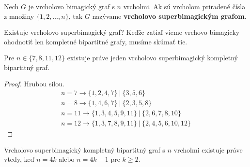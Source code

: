 \begin{definition} Nech $G$ je vrcholovo bimagický graf s $n$ vrcholmi. Ak sú vrcholom priradené čísla z množiny $\{1, 2, \dots , n\}$, tak $G$ nazývame \textbf{vrcholovo superbimagickým grafom}.
\end{definition} 

Existuje vrcholovo superbimagický graf? Keďže zatiaľ vieme vrchovo bimagicky ohodnotiť len kompletné bipartitné grafy, musíme skúmať tie. \\

\begin{theorem}
\label{vsbg1}
Pre $n \in \{7, 8, 11, 12\}$  existuje práve jeden vrcholovo superbimagický kompletný bipartitný graf.
\end{theorem}

\begin{proof} Hrubou silou.
\begin{gather*}
n = 7 \rightarrow \{1, 2, 4, 7\} ~|~ \{3, 5, 6\} \\
n = 8 \rightarrow \{1, 4, 6, 7\} ~|~ \{2, 3, 5, 8\} \\
n = 11 \rightarrow \{1, 3, 4, 5, 9, 11\} ~|~ \{2, 6, 7, 8, 10\} \\
n = 12 \rightarrow \{1, 3, 7, 8, 9, 11\} ~|~ \{2, 4, 5, 6, 10, 12\}
\end{gather*}
\end{proof}

\begin{theorem}
\label{vsbgkij}
Vrcholovo superbimagický kompletný bipartitný graf s $n$ vrcholmi existuje práve vtedy, keď $n = 4k$ alebo $n = 4k-1$ pre $k \geq 2$.
\end{theorem}

